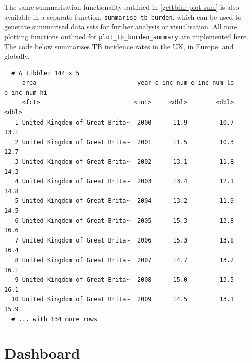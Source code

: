 \documentclass[11pt,twoside]{bristolthesis}
\begin{document}
  The same summarisation functionality outlined in \ref{gettbinr-plot-sum} is also available in a separate function, \texttt{summarise\_tb\_burden}, which can be used to generate summarised data sets for further analysis or visualisation. All non-plotting functions outlined for \texttt{plot\_tb\_burden\_summary} are implemented here. The code below summarises TB incidence rates in the UK, in Europe, and globally.
  \begin{Shaded}
  \begin{Highlighting}[]
  \NormalTok{(} \NormalTok{,}
                        \NormalTok{,}
                        \NormalTok{, }
                        \NormalTok{, }
                        \NormalTok{,}
                        \NormalTok{)}
  \end{Highlighting}
  \end{Shaded}
  \begin{verbatim}
  # A tibble: 144 x 5
     area                            year e_inc_num e_inc_num_lo e_inc_num_hi
     <fct>                          <int>     <dbl>        <dbl>        <dbl>
   1 United Kingdom of Great Brita~  2000      11.9         10.7         13.1
   2 United Kingdom of Great Brita~  2001      11.5         10.3         12.7
   3 United Kingdom of Great Brita~  2002      13.1         11.8         14.3
   4 United Kingdom of Great Brita~  2003      13.4         12.1         14.8
   5 United Kingdom of Great Brita~  2004      13.2         11.9         14.5
   6 United Kingdom of Great Brita~  2005      15.3         13.8         16.6
   7 United Kingdom of Great Brita~  2006      15.3         13.8         16.4
   8 United Kingdom of Great Brita~  2007      14.7         13.2         16.1
   9 United Kingdom of Great Brita~  2008      15.0         13.5         16.1
  10 United Kingdom of Great Brita~  2009      14.5         13.1         15.9
  # ... with 134 more rows
  \end{verbatim}
  \hypertarget{dashboard}{%
  \section{Dashboard}\label{dashboard}}
  
\end{document}
